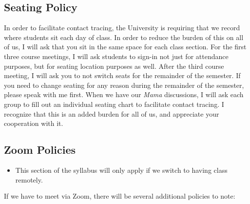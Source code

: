 \documentclass[
]{book}
\newenvironment{rmdblock}[1]
  {\begin{shaded*}
  \begin{itemize}
  \renewcommand{\labelitemi}{
    \raisebox{-.7\height}[0pt][0pt]{
      {\setkeys{Gin}{width=3em,keepaspectratio}\texttt{[image: images/\#1]}}
    }
  }
  \item
  }
  {
  \end{itemize}
  \end{shaded*}
  }
\newenvironment{rmdwarning}
  {\begin{rmdblock}{warning}}
  {\end{rmdblock}}
\begin{document}
\hypertarget{seating-policy}{%
\subsection{Seating Policy}\label{seating-policy}}

In order to facilitate contact tracing, the University is requiring that we record where students sit each day of class. In order to reduce the burden of this on all of us, I will ask that you sit in the same space for each class section. For the first three course meetings, I will ask students to sign-in not just for attendance purposes, but for seating location purposes as well. After the third course meeting, I will ask you to not switch seats for the remainder of the semester. If you need to change seating for any reason during the remainder of the semester, please speak with me first. When we have our \emph{Mama} discussions, I will ask each group to fill out an individual seating chart to facilitate contact tracing. I recognize that this is an added burden for all of us, and appreciate your cooperation with it.

\hypertarget{zoom-policies}{%
\subsection{Zoom Policies}\label{zoom-policies}}

\begin{rmdwarning}
This section of the syllabus will only apply if we switch to having
class remotely.
\end{rmdwarning}

If we have to meet via Zoom, there will be several additional policies to note:
\end{document}
